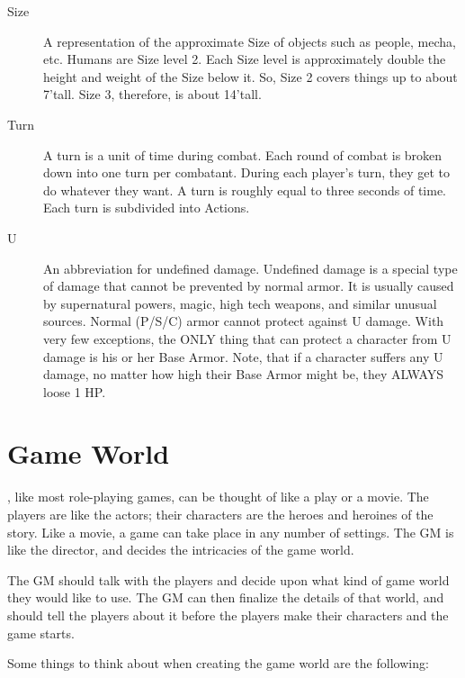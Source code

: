 \documentclass[twoside]{book}
\begin{document}
\begin{description}
  \item[Size] 
    {  
    A representation of the approximate Size of objects such as people, mecha, etc. Humans are Size level 2. Each Size level is approximately double the height and weight of the Size below it. So, Size 2 covers things up to about 7'tall. Size 3, therefore, is about 14'tall.
    }
  
  \item[Turn] 
    {  
    A turn is a unit of time during combat. Each round of combat is broken down into one turn per combatant. During each player's turn, they get to do whatever they want. A turn is roughly equal to three seconds of time. Each turn is subdivided into Actions.
    }
  
  \item[U] 
    {  
    An abbreviation for undefined damage. Undefined damage is a special type of damage that cannot be prevented by normal armor. It is usually caused by supernatural powers, magic, high tech weapons, and similar unusual sources. Normal (P/S/C) armor cannot protect against U damage. With very few exceptions, the ONLY thing that can protect a character from U damage is his or her Base Armor. Note, that if a character suffers any U damage, no matter how high their Base Armor might be, they ALWAYS loose 1 HP.
    }
  
\end{description}
  
    

\section{Game World}
    
    {  
    \APATHY{}, like most role-playing games, can be thought of like a play or a movie. The players are like the actors; their characters are the heroes and heroines of the story. Like a movie, a game can take place in any number of settings. The GM is like the director, and decides the intricacies of the game world.
    }
  
    {  
    The GM should talk with the players and decide upon what kind of game world they would like to use. The GM can then finalize the details of that world, and should tell the players about it before the players make their characters and the game starts.
    }
  
    {  
    Some things to think about when creating the game world are the following:
    }
  
\end{document}
